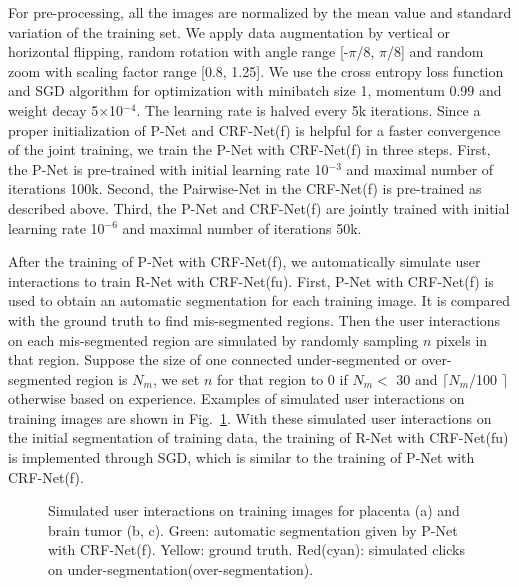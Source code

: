 \documentclass[10pt,journal,compsoc]{IEEEtran}
\begin{document}
For pre-processing, all the images are normalized by the mean value and standard variation of the training set. We apply data augmentation by vertical or horizontal flipping, random rotation with angle range [-$\pi$/8, $\pi$/8] and random zoom with scaling factor range [0.8, 1.25]. We use the cross entropy loss function and SGD algorithm for optimization with minibatch size 1, momentum 0.99 and weight decay 5$\times$10$^{-4}$. The learning rate is halved every 5k iterations. Since a proper initialization of P-Net and CRF-Net(f) is helpful for a faster convergence of the joint training, we train the P-Net with CRF-Net(f) in three steps. First, the P-Net is pre-trained with initial learning rate 10$^{-3}$ and maximal number of iterations 100k. Second, the Pairwise-Net in the CRF-Net(f) is pre-trained as described above. Third, the P-Net and CRF-Net(f) are jointly trained with initial learning rate 10$^{-6}$ and maximal number of iterations 50k.

After the training of P-Net with CRF-Net(f), we automatically simulate user interactions to train R-Net with CRF-Net(fu). First, P-Net with CRF-Net(f) is used to obtain an automatic segmentation for each training image. It is compared with the ground truth to find mis-segmented regions. Then the user interactions on each mis-segmented region are simulated by randomly sampling $n$ pixels in that region. Suppose the size of one connected under-segmented or over-segmented  region is $N_m$, we set $n$ for that region to 0 if $N_m<$ 30 and $\lceil N_m$/100 $\rceil$ otherwise based on experience. %
Examples of simulated user interactions on training images are shown in Fig.~\ref{fig:simulate_interaction}. With these simulated user interactions on the initial segmentation of training data, the training of R-Net with CRF-Net(fu) is implemented through SGD, which is similar to the training of P-Net with CRF-Net(f). %

\begin{figure}[t]
	\centering 
	\caption{
		Simulated user interactions on training images for placenta (a) and brain tumor (b, c). Green: automatic segmentation given by P-Net with CRF-Net(f). Yellow: ground truth. Red(cyan): simulated clicks on under-segmentation(over-segmentation).} 
	\label{fig:simulate_interaction}
\end{figure}
\end{document}
